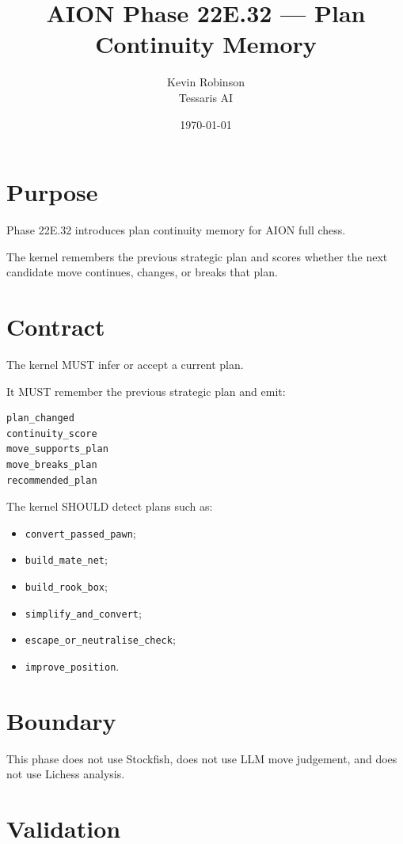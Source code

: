\documentclass[11pt,a4paper]{article}
\title{\textbf{AION Phase 22E.32 --- Plan Continuity Memory}}
\author{Kevin Robinson\\Tessaris AI}
\date{\today}
\begin{document}
\maketitle

\section{Purpose}

Phase 22E.32 introduces plan continuity memory for AION full chess.

The kernel remembers the previous strategic plan and scores whether the next candidate move continues, changes, or breaks that plan.

\section{Contract}

The kernel MUST infer or accept a current plan.

It MUST remember the previous strategic plan and emit:

\begin{verbatim}
plan_changed
continuity_score
move_supports_plan
move_breaks_plan
recommended_plan
\end{verbatim}

The kernel SHOULD detect plans such as:

\begin{itemize}[leftmargin=*]
  \item \texttt{convert\_passed\_pawn};
  \item \texttt{build\_mate\_net};
  \item \texttt{build\_rook\_box};
  \item \texttt{simplify\_and\_convert};
  \item \texttt{escape\_or\_neutralise\_check};
  \item \texttt{improve\_position}.
\end{itemize}

\section{Boundary}

This phase does not use Stockfish, does not use LLM move judgement, and does not use Lichess analysis.

\section{Validation}
\end{document}
